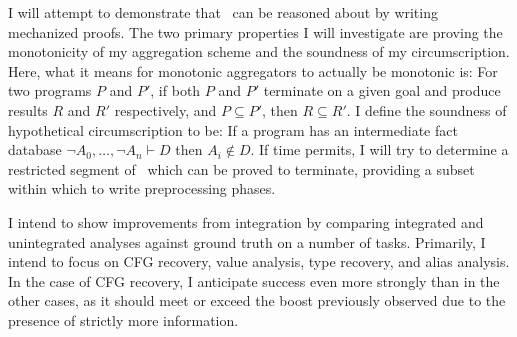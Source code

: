 I will attempt to demonstrate that \sysname\ can be reasoned about by writing mechanized proofs.
The two primary properties I will investigate are proving the monotonicity of my aggregation scheme and the soundness of my circumscription.
Here, what it means for monotonic aggregators to actually be monotonic is:
For two programs $P$ and $P'$, if both $P$ and $P'$ terminate on a given goal and produce results $R$ and $R'$ respectively, and $P \subseteq P'$, then $R \subseteq R'$.
I define the soundness of hypothetical circumscription to be:
If a program has an intermediate fact database $\neg A_0,\ldots, \neg A_n \vdash D$ then $A_i \not \in D$. 
If time permits, I will try to determine a restricted segment of \sysname\ which can be proved to terminate, providing a subset within which to write preprocessing phases.

I intend to show improvements from integration by comparing integrated and unintegrated analyses against ground truth on a number of tasks.
Primarily, I intend to focus on CFG recovery, value analysis, type recovery, and alias analysis.
In the case of CFG recovery, I anticipate success even more strongly than in the other cases, as it should meet or exceed the boost previously observed\cite{jakstab} due to the presence of strictly more information.

